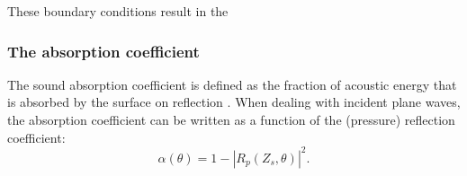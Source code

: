 These boundary conditions result in the 
 





\subsubsection*{The absorption coefficient}
\vspace{-15pt}
The sound absorption coefficient is defined as the fraction of acoustic energy that is absorbed by the surface on reflection \cite[p.12]{Geetere}.  When dealing with incident plane waves, the absorption coefficient can be written as a function of the (pressure) reflection coefficient:
\[
\alpha(\theta) = 1 - \left|R_p(Z_s, \theta)\right|^2.
\]












